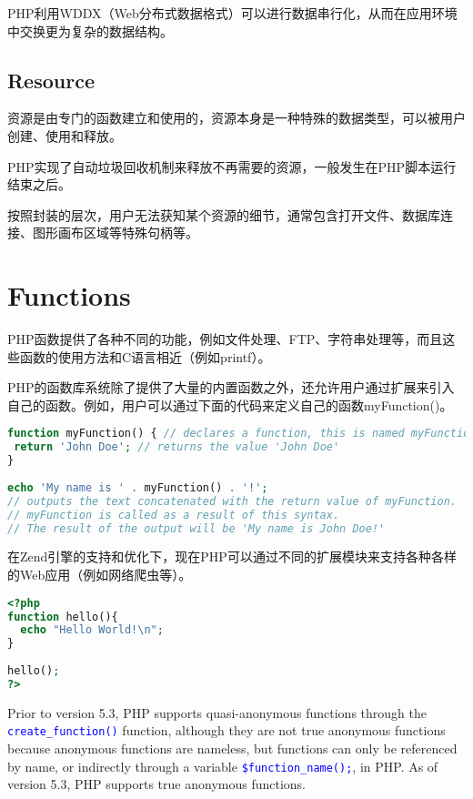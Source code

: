 PHP利用WDDX（Web分布式数据格式）可以进行数据串行化，从而在应用环境中交换更为复杂的数据结构。

\section{Resource}


资源是由专门的函数建立和使用的，资源本身是一种特殊的数据类型，可以被用户创建、使用和释放。

PHP实现了自动垃圾回收机制来释放不再需要的资源，一般发生在PHP脚本运行结束之后。

按照封装的层次，用户无法获知某个资源的细节，通常包含打开文件、数据库连接、图形画布区域等特殊句柄等。



\chapter{Functions}

PHP函数提供了各种不同的功能，例如文件处理、FTP、字符串处理等，而且这些函数的使用方法和C语言相近（例如printf）。

PHP的函数库系统除了提供了大量的内置函数之外，还允许用户通过扩展来引入自己的函数。例如，用户可以通过下面的代码来定义自己的函数myFunction()。


\begin{lstlisting}[language=PHP]
function myFunction() { // declares a function, this is named myFunction
 return 'John Doe'; // returns the value 'John Doe'
}
 
echo 'My name is ' . myFunction() . '!'; 
// outputs the text concatenated with the return value of myFunction.
// myFunction is called as a result of this syntax.
// The result of the output will be 'My name is John Doe!'
\end{lstlisting}

在Zend引擎的支持和优化下，现在PHP可以通过不同的扩展模块来支持各种各样的Web应用（例如网络爬虫等）。

\begin{lstlisting}[language=PHP]
<?php
function hello(){
  echo "Hello World!\n";
}
 
hello();
?>
\end{lstlisting}

Prior to version 5.3, PHP supports quasi-anonymous functions through the \textcolor{Blue}{\texttt{create\_function()}} function, although they are not true anonymous functions because anonymous functions are nameless, but functions can only be referenced by name, or indirectly through a variable \textcolor{Blue}{\texttt{\$function\_name();}}, in PHP. As of version 5.3, PHP supports true anonymous functions.


